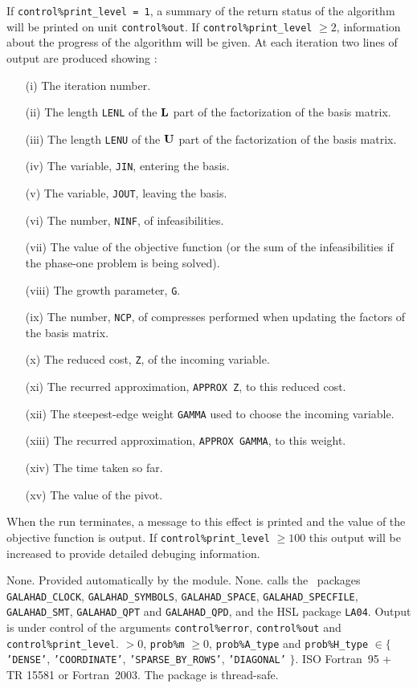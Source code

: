 \documentclass{galahad}
\newcommand{\packagename}{LPA}
\begin{document}
\galinfo
If {\tt control\%print\_level = 1}, a summary of the return status
of the algorithm will be printed on unit {\tt control\-\%out}.
If {\tt control\%print\_level} $\geq 2$, information about the progress
of the algorithm will be given.
At each iteration two lines of output are produced showing :
\begin{enumerate}
\item[(i)] The iteration number.
\item[(ii)] The length {\tt LENL} of the ${\mathbf{L}}$ part of the factorization of
the basis matrix.
\item[(iii)] The length {\tt LENU} of the ${\mathbf{U}}$ part of the factorization of
the basis matrix.
\item[(iv)] The variable, {\tt JIN}, entering the basis.
\item[(v)] The variable, {\tt JOUT}, leaving the basis.
\item[(vi)] The number, {\tt NINF}, of infeasibilities.
\item[(vii)] The value of the objective function (or the sum
of the infeasibilities if the phase-one problem is being solved).
\item[(viii)] The growth parameter, {\tt G}.
\item[(ix)] The number, {\tt NCP}, of compresses performed when updating the factors of the
  basis matrix.
\item[(x)] The reduced cost, {\tt Z}, of the incoming variable.
\item[(xi)] The recurred approximation, {\tt APPROX Z},  to this reduced cost.
\item[(xii)] The steepest-edge weight {\tt GAMMA} used to choose the incoming
variable.
\item[(xiii)] The recurred approximation, {\tt APPROX GAMMA}, to this weight.
\item[(xiv)] The time taken so far.
\item[(xv)] The value of the pivot.
\end{enumerate}
When the run terminates, a message to this effect is printed and
the value of the objective function is output.
If {\tt control\%print\_level} $\geq 100$ this
output will be increased to provide detailed debuging information.


\galgeneral

\galcommon None.
\galworkspace Provided automatically by the module.
\galroutines None.
\galmodules {\tt \packagename\_solve} calls the \galahad\ packages
{\tt GALAHAD\_CLOCK},
{\tt GALAHAD\_SY\-M\-BOLS},
{\tt GALA\-HAD\_SPACE},
{\tt GALAHAD\_SPECFILE},
{\tt GALAHAD\_SMT},
{\tt GALAHAD\_QPT}
and
{\tt GALAHAD\_QPD},
and the HSL package {\tt LA04}.
\galio Output is under control of the arguments
 {\tt control\%error}, {\tt control\%out} and {\tt control\%print\_level}.
 $> 0$, {\tt prob\%m} $\geq  0$,
{\tt prob\%A\_type} and {\tt prob\%H\_type} $\in \{${\tt 'DENSE'},
 {\tt 'COORDINATE'}, {\tt 'SPARSE\_BY\_\-ROWS'}, {\tt 'DIAGONAL'} $\}$.
\galportability ISO Fortran~95 + TR 15581 or Fortran~2003.
The package is thread-safe.
\end{document}
